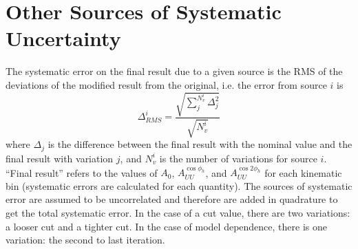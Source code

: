 \section{Other Sources of Systematic Uncertainty}
\label{sec:OtherSystematicUncertainty}
The systematic error on the final result due to a given source is the RMS of the deviations of the modified result from the original, i.e. the error from source $i$ is
%
\begin{equation}
\label{eq:RMS}
\Delta_{RMS}^i = \frac{\sqrt{\sum_j^{N_v^i} \Delta_j^2}}{\sqrt{N_v^i}}
\end{equation}
%
where $\Delta_j$ is the difference between the final result with the nominal value and the final result with variation $j$, and $N_v^i$ is the number of variations for source $i$.
``Final result'' refers to the values of $A_0$, $A_{UU}^{\cos\phi_h}$, and $A_{UU}^{\cos 2\phi_h}$ for each kinematic bin (systematic errors are calculated for each quantity).
The sources of systematic error are assumed to be uncorrelated and therefore are added in quadrature to get the total systematic error.
In the case of a cut value, there are two variations: a looser cut and a tighter cut.
In the case of model dependence, there is one variation: the second to last iteration.
%
